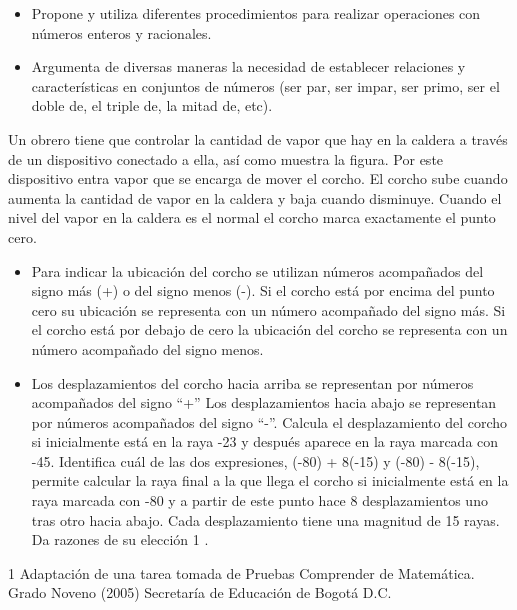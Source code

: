 
\evidencias

\begin{itemize}
  \item Propone y utiliza diferentes procedimientos para realizar operaciones con números enteros y racionales.
  \item Argumenta de diversas maneras la necesidad de establecer relaciones y características en conjuntos de números (ser par, ser impar, ser primo, ser el doble de, el triple de, la mitad de, etc).
\end{itemize}

\ejemplo

Un obrero tiene que controlar la cantidad de vapor que hay en la caldera a través de un dispositivo conectado a ella, así como muestra la figura. Por este dispositivo entra vapor que se encarga de mover el corcho. El corcho sube cuando aumenta la cantidad de vapor en la caldera y baja cuando disminuye. Cuando el nivel del vapor en la caldera es el normal el corcho marca exactamente el punto cero.


\begin{itemize}
  \item Para indicar la ubicación del corcho se utilizan números acompañados del signo más (+) o del signo menos (-). Si el corcho está por encima del punto cero su ubicación se representa con un número acompañado del signo más. Si el corcho está por debajo de cero la ubicación del corcho se representa con un número acompañado del signo menos.
  \item Los desplazamientos del corcho hacia arriba se representan por números acompañados del signo “+” Los desplazamientos hacia abajo se representan por números acompañados del signo “-”. Calcula el desplazamiento del corcho si inicialmente está en la raya -23 y después aparece en la raya marcada con -45. Identifica cuál de las dos expresiones, (-80) + 8(-15) y (-80) - 8(-15), permite calcular la raya final a la que llega el corcho si inicialmente está en la raya marcada con -80 y a partir de este punto hace 8 desplazamientos uno tras otro hacia abajo. Cada desplazamiento tiene una magnitud de 15 rayas. Da razones de su elección 1 .
\end{itemize}
1 Adaptación de una tarea tomada de Pruebas Comprender de Matemática. Grado Noveno (2005) Secretaría de Educación de Bogotá D.C.

